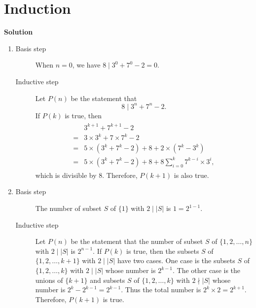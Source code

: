 \documentclass{../../cls/sig-alternate-05-2015}
\begin{document}
\section{Induction}
\textbf{Solution}\begin{enumerate}[label=(\alph*)]
    \item \begin{description}
        \item[Basis step] When $n = 0$, we have $8 \mid 3^0 + 7^0 - 2 = 0$.
        \item[Inductive step] Let $P(n)$ be the statement that \begin{equation}
            8 \mid 3^n + 7^n - 2.
        \end{equation}
        If $P(k)$ is true, then \begin{align}
            \begin{aligned}
            & 3^{k + 1} + 7^{k + 1} - 2\\
            = & 3 \times 3^k + 7 \times 7^k - 2\\
            = & 5 \times (3^k + 7^k - 2) + 8 + 2 \times (7^k - 3^k)\\
            = & 5 \times (3^k + 7^k - 2) + 8 + 8 \sum_{i = 0}^{k} 7^{k - i} \times 3^i,
            \end{aligned}
        \end{align} which is divisible by 8. Therefore, $P(k + 1)$ is also true.
    \end{description}

    \item \begin{description}
        \item[Basis step] The number of subset $S$ of $\{1\}$ with $2 \mid \left|S\right|$ is $1 = 2^{1 - 1}$.
        \item[Inductive step] Let $P(n)$ be the statement that the number of subset $S$ of $\{1, 2, \ldots, n\}$ with $2 \mid \left|S\right|$ is $2^{n - 1}$. If $P(k)$ is true, then the subsets $S$ of $\{1, 2, \ldots, k + 1\}$ with $2 \mid \left|S\right|$ have two cases. One case is the subsets $S$ of $\{1, 2, \ldots, k\}$ with $2 \mid \left|S\right|$ whose number is $2^{k - 1}$. The other case is the unions of $\{k + 1\}$ and subsets $S$ of $\{1, 2, \ldots, k\}$ with $2 \nmid \left|S\right|$ whose number is $2^k - 2^{k - 1} = 2^{k - 1}$. Thus the total number is $2^k \times 2 = 2^{k + 1}$. Therefore, $P(k + 1)$ is true.
    \end{description}
\end{enumerate}
\end{document}
